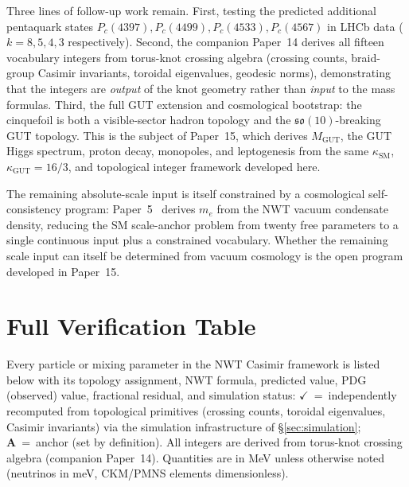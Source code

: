 \documentclass[11pt]{article}
\newcommand{\so}{\mathfrak{so}}
\newcommand{\ksm}{\kappa_\text{SM}}
\newcommand{\kgut}{\kappa_\text{GUT}}
\begin{document}
Three lines of follow-up work remain.  First, testing the
predicted additional pentaquark states
$P_c(4397), P_c(4499), P_c(4533), P_c(4567)$ in LHCb data
($k = 8, 5, 4, 3$ respectively).
Second, the companion Paper~14 derives all fifteen vocabulary
integers from torus-knot crossing algebra (crossing counts,
braid-group Casimir invariants, toroidal eigenvalues, geodesic
norms), demonstrating that the integers are \emph{output} of the
knot geometry rather than \emph{input} to the mass formulas.
Third, the full GUT extension and cosmological bootstrap: the
cinquefoil is both a visible-sector hadron topology and the
$\so(10)$-breaking GUT topology.  This is the subject of
Paper~15, which derives $M_\text{GUT}$, the GUT Higgs spectrum,
proton decay, monopoles, and leptogenesis from the same $\ksm$,
$\kgut = 16/3$, and topological integer framework developed here.

The remaining absolute-scale input is itself constrained by a
cosmological self-consistency program: Paper~5~\cite{NWT5}
derives $m_e$ from the NWT vacuum condensate density, reducing the
SM scale-anchor problem from twenty free parameters to a single
continuous input plus a constrained vocabulary.  Whether the
remaining scale input can itself be determined from vacuum
cosmology is the open program developed in Paper~15.

\appendix

\section{Full Verification Table}
\label{app:table}

Every particle or mixing parameter in the NWT Casimir framework is
listed below with its topology assignment, NWT formula, predicted
value, PDG (observed) value, fractional residual, and simulation
status: $\checkmark$~=~independently recomputed from topological
primitives (crossing counts, toroidal eigenvalues, Casimir
invariants) via the simulation infrastructure of
\S\ref{sec:simulation}; \textbf{A}~=~anchor (set by definition).
All integers are derived from torus-knot crossing algebra
(companion Paper~14).  Quantities are in MeV unless otherwise
noted (neutrinos in meV, CKM/PMNS elements dimensionless).
\end{document}
